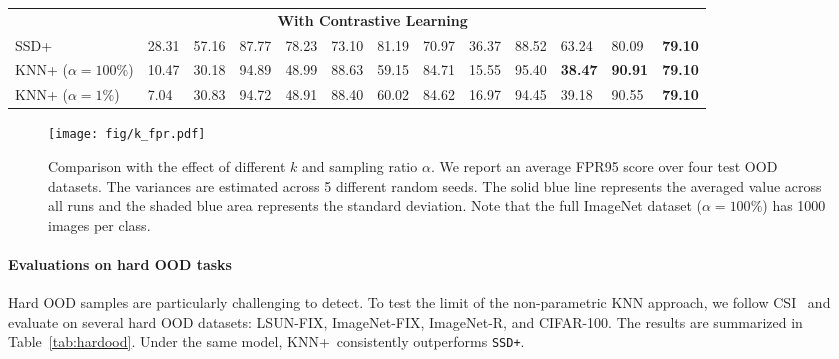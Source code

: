 \documentclass[nohyperref]{article}
\newcommand{\methodplus}{{KNN+}}
\theoremstyle{plain}
\theoremstyle{definition}
\theoremstyle{remark}
\begin{document}
\begin{table*}[t]
{\begin{tabular}{lllllllllllll}
\hline
&\multicolumn{10}{c}{\textbf{With Contrastive Learning}}          \\
SSD+ & 28.31 & 57.16 & 87.77 & 78.23 & 73.10 & 81.19 & 70.97 & 36.37 & 88.52 & 63.24 & 80.09 & \textbf{79.10}\\
KNN+ ($\alpha=100\%$) & 10.47 & 30.18 & 94.89 & 48.99 & 88.63 & 59.15 & 84.71 & 15.55 & 95.40 & \textbf{38.47} & \textbf{90.91} & \textbf{79.10} \\
KNN+ ($\alpha=1\%$) & 7.04 & 30.83 & 94.72 & 48.91 & 88.40 & 60.02 & 84.62 & 16.97 & 94.45 & 39.18 & 90.55 & \textbf{79.10} \\ \bottomrule
\end{tabular}}
\label{tab:imagenet_main}
\end{table*}





\begin{figure*}[tb]
\begin{center}
		\texttt{[image: fig/k\_fpr.pdf]}
	\end{center}
	\vspace{-0.4cm}
	\caption{Comparison with the effect of different $k$ and sampling ratio $\alpha$. We report an average FPR95 score over four test OOD datasets. The variances are estimated across 5 different random seeds. The solid blue line represents the averaged value across all runs and the shaded blue area represents the standard deviation. Note that the full ImageNet dataset ($\alpha=100\%$) has 1000 images per class. }
	\label{fig:k_fpr}
\end{figure*}





\paragraph{Evaluations on hard OOD tasks} Hard OOD samples are particularly
challenging to detect. To test the limit of the  non-parametric KNN approach, we follow CSI~\citep{tack2020csi} and evaluate on several hard OOD datasets: LSUN-FIX, ImageNet-FIX, ImageNet-R, and CIFAR-100. The results are summarized in Table~\ref{tab:hardood}. Under the same model, {\methodplus~consistently outperforms \texttt{SSD+}}. 
\end{document}
